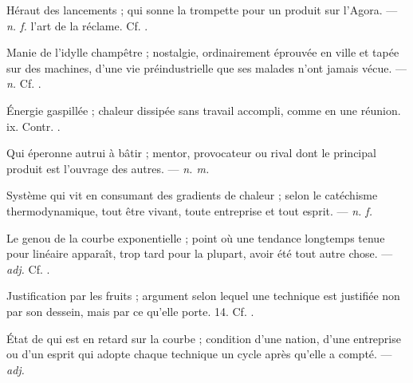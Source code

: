  Héraut des lancements ; qui sonne la trompette pour un produit sur l'Agora. ---  \textit{n. f.} l'art de la réclame. Cf. .

 Manie de l'idylle champêtre ; nostalgie, ordinairement éprouvée en ville et tapée sur des machines, d'une vie préindustrielle que ses malades n'ont jamais vécue. ---  \textit{n.} Cf. .

 Énergie gaspillée ; chaleur dissipée sans travail accompli, comme en une réunion.   ix. Contr. .

 Qui éperonne autrui à bâtir ; mentor, provocateur ou rival dont le principal produit est l'ouvrage des autres.  ---  \textit{n. m.}

 Système qui vit en consumant des gradients de chaleur ; selon le catéchisme thermodynamique, tout être vivant, toute entreprise et tout esprit.   ---  \textit{n. f.}

 Le genou de la courbe exponentielle ; point où une tendance longtemps tenue pour linéaire apparaît, trop tard pour la plupart, avoir été tout autre chose.   ---  \textit{adj.} Cf. .

 Justification par les fruits ; argument selon lequel une technique est justifiée non par son dessein, mais par ce qu'elle porte.   14. Cf. .

 État de qui est en retard sur la courbe ; condition d'une nation, d'une entreprise ou d'un esprit qui adopte chaque technique un cycle après qu'elle a compté. ---  \textit{adj.}

